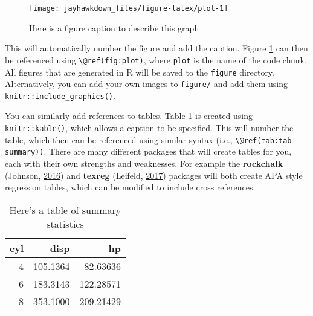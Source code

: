 \documentclass[12pt,english]{kuthesis}
\newenvironment{Shaded}{\begin{snugshade}}{\end{snugshade}}
\newcommand{\KeywordTok}[1]{\textcolor[rgb]{0.13,0.29,0.53}{\textbf{#1}}}
\newcommand{\DataTypeTok}[1]{\textcolor[rgb]{0.13,0.29,0.53}{#1}}
\newcommand{\StringTok}[1]{\textcolor[rgb]{0.31,0.60,0.02}{#1}}
\newcommand{\OtherTok}[1]{\textcolor[rgb]{0.56,0.35,0.01}{#1}}
\newcommand{\OperatorTok}[1]{\textcolor[rgb]{0.81,0.36,0.00}{\textbf{#1}}}
\newcommand{\NormalTok}[1]{#1}
\begin{document}
\begin{figure}

{\centering \texttt{[image: jayhawkdown\_files/figure-latex/plot-1]} 

}

\caption{Here is a figure caption to describe this graph}\label{fig:plot}
\end{figure}

This will automatically number the figure and add the caption. Figure \ref{fig:plot} can then be referenced using \texttt{\textbackslash{}@ref(fig:plot)}, where \texttt{plot} is the name of the code chunk. All figures that are generated in R will be saved to the \texttt{figure} directory. Alternatively, you can add your own images to \texttt{figure/} and add them using \texttt{knitr::include\_graphics()}.

You can similarly add references to tables. Table \ref{tab:tab-summary} is created using \texttt{knitr::kable()}, which allows a caption to be specified. This will number the table, which then can be referenced using similar syntax (i.e., \texttt{\textbackslash{}@ref(tab:tab-summary))}. There are many different packages that will create tables for you, each with their own strengths and weaknesses. For example the \textbf{rockchalk} (Johnson, \protect\hyperlink{ref-R-rockchalk}{2016}) and \textbf{texreg} (Leifeld, \protect\hyperlink{ref-R-texreg}{2017}) packages will both create APA style regression tables, which can be modified to include cross references.

\begin{Shaded}
\end{Shaded}

\begin{table}

\caption{\label{tab:tab-summary}Here's a table of summary statistics}
\centering
\begin{tabular}[t]{rrr}
\toprule
cyl & disp & hp\\
\midrule
4 & 105.1364 & 82.63636\\
6 & 183.3143 & 122.28571\\
8 & 353.1000 & 209.21429\\
\bottomrule
\end{tabular}
\end{table}
\end{document}
